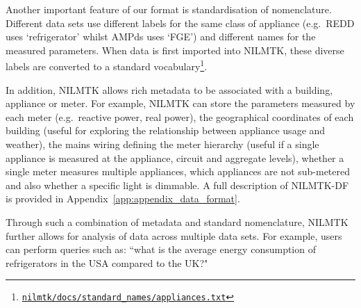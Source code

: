 \documentclass{sig-alternate}
\newcommand{\bluecolor}[1]{\textcolor{blue}{#1}}
\newcommand{\appref}[1]{Appendix~\ref{#1}}
\begin{document}
Another important feature of our format is standardisation of nomenclature.  Different data sets use different labels for the same class of appliance (e.g.\ REDD uses `refrigerator' whilst AMPds uses `FGE') and different names for the measured parameters.  When data is first imported into NILMTK, these diverse labels are converted to a standard vocabulary\footnote{\href{https://github.com/nilmtk/nilmtk/blob/master/docs/standard_names/appliances.txt}{\texttt{nilmtk/docs/standard\_names/appliances.txt}}}.

In addition, NILMTK allows rich metadata to be associated with a building, appliance or meter.  For example, NILMTK can store the parameters measured by each meter (e.g.\ reactive power, real power), the geographical coordinates of each building (useful for exploring the relationship between appliance usage and weather), the mains wiring defining the meter hierarchy (useful if a single appliance is measured at the appliance, circuit and aggregate levels), whether a single meter measures multiple appliances, which appliances are not sub-metered and also whether a specific light is dimmable. A full description of NILMTK-DF is provided in \appref{app:appendix_data_format}.


Through such a combination of metadata and standard nomenclature, NILMTK further allows for analysis of data across multiple  data sets. For example, users can perform queries such as:
``what is the average energy consumption of refrigerators in the USA compared to the UK?"
\end{document}
